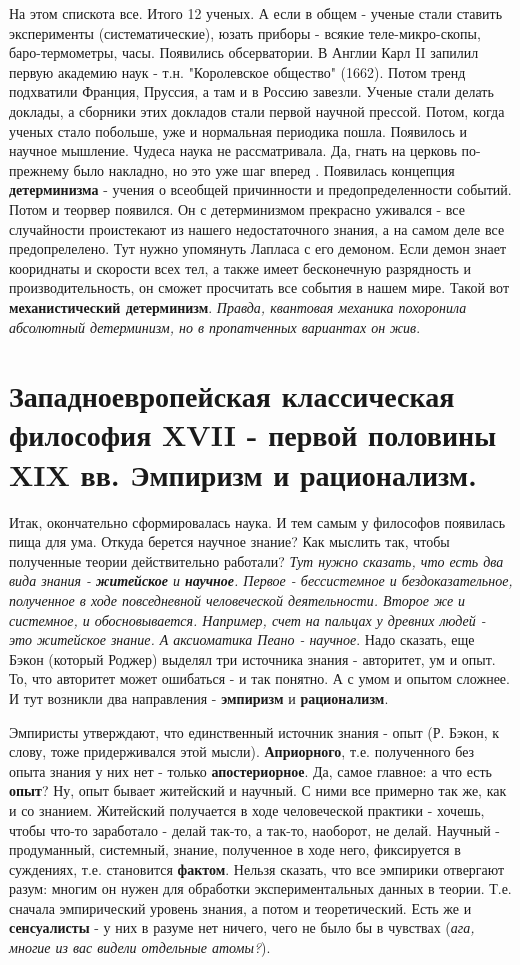 На этом спискота все. Итого 12 ученых. А если в общем - ученые стали ставить эксперименты (систематические), юзать приборы - всякие теле-микро-скопы, баро-термометры, часы. Появились обсерватории. В Англии Карл II запилил первую академию наук - т.н. "Королевское общество" (1662). Потом тренд подхватили Франция, Пруссия, а там и в Россию завезли. Ученые стали делать доклады, а сборники этих докладов стали первой научной прессой. Потом, когда ученых стало побольше, уже и нормальная периодика пошла. Появилось и научное мышление. Чудеса наука не рассматривала. Да, гнать на церковь по-прежнему было накладно, но это уже шаг вперед . Появилась концепция \textbf{детерминизма} - учения о всеобщей причинности и предопределенности событий. Потом и теорвер появился. Он с детерминизмом прекрасно уживался - все случайности проистекают из нашего недостаточного знания, а на самом деле все предопрелелено. Тут нужно упомянуть Лапласа с его демоном. Если демон знает коориднаты и скорости всех тел, а также имеет бесконечную разрядность и производительность, он сможет просчитать все события в нашем мире. Такой вот \textbf{механистический детерминизм}. \textit{Правда, квантовая механика похоронила абсолютный детерминизм, но в пропатченных вариантах он жив}.

\section{Западноевропейская классическая философия XVII - первой половины XIX вв. Эмпиризм и рационализм.}
Итак, окончательно сформировалась наука. И тем самым у философов появилась пища для ума. Откуда берется научное знание? Как мыслить так, чтобы полученные теории действительно работали? \textit{Тут нужно сказать, что есть два вида знания - \textbf{житейское} и \textbf{научное}. Первое - бессистемное и бездоказательное, полученное в ходе повседневной человеческой деятельности. Второе же и системное, и обосновывается. Например, счет на пальцах у древних людей - это житейское знание. А аксиоматика Пеано - научное}. Надо сказать, еще Бэкон (который Роджер) выделял три источника знания - авторитет, ум и опыт. То, что авторитет может ошибаться - и так понятно. А с умом и опытом сложнее. И тут возникли два направления - \textbf{эмпиризм} и \textbf{рационализм}.

Эмпиристы утверждают, что единственный источник знания - опыт (Р. Бэкон, к слову, тоже придерживался этой мысли). \textbf{Априорного}, т.е. полученного без опыта знания у них нет - только  \textbf{апостериорное}. Да, самое главное: а что есть \textbf{опыт}? Ну, опыт бывает житейский и научный. С ними все примерно так же, как и со знанием. Житейский получается в ходе человеческой практики - хочешь, чтобы что-то заработало - делай так-то, а так-то, наоборот, не делай. Научный - продуманный, системный, знание, полученное в ходе него, фиксируется в суждениях, т.е. становится \textbf{фактом}. Нельзя сказать, что все эмпирики отвергают разум: многим он нужен для обработки экспериментальных данных в теории. Т.е. сначала эмпирический уровень знания, а потом и теоретический. Есть же и \textbf{сенсуалисты} - у них в разуме нет ничего, чего не было бы в чувствах (\textit{ага, многие из вас видели отдельные атомы?}).

